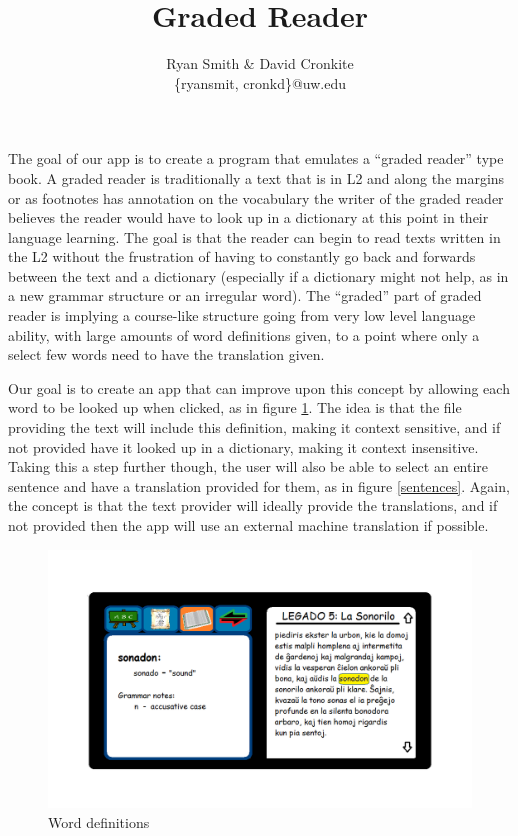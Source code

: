 \documentclass[11pt]{article}
\author{Ryan Smith \& David Cronkite \\ \{ryansmit, cronkd\}@uw.edu}
\title{Graded Reader}
\begin{document}
\maketitle

The goal of our app is to create a program that emulates a ``graded reader'' type book.  A graded reader is traditionally a text that is in L2 and along the margins or as footnotes has annotation on the vocabulary the writer of the graded reader believes the reader would have to look up in a dictionary at this point in their language learning.  The goal is that the reader can begin to read texts written in the L2 without the frustration of having to constantly go back and forwards between the text and a dictionary (especially if a dictionary might not help, as in a new grammar structure or an irregular word).  The ``graded'' part of graded reader is implying a course-like structure going from very low level language ability, with large amounts of word definitions given, to a point where only a select few words need to have the translation given.

Our goal is to create an app that can improve upon this concept by allowing each word to be looked up when clicked, as in figure \ref{words}. The idea is that the file providing the text will include this definition, making it context sensitive, and if not provided have it looked up in a dictionary, making it context insensitive.  Taking this a step further though, the user will also be able to select an entire sentence and have a translation provided for them, as in figure \ref{sentences}.  Again, the concept is that the text provider will ideally provide the translations, and if not provided then the app will use an external machine translation if possible.

\begin{figure}[h]
  \caption{Word definitions}
  \label{words}
  \includegraphics[scale=.5]{word_look_up.png}
\end{figure}
\end{document}
